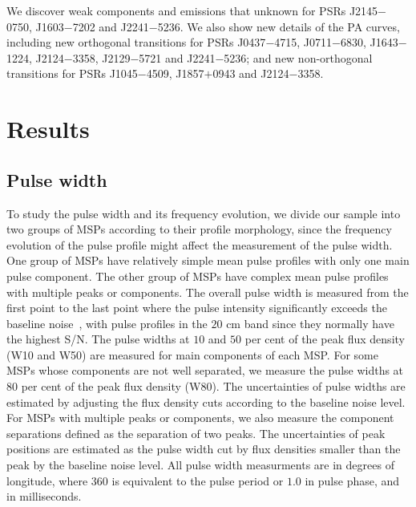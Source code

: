 \documentclass[useAMS,usenatbib]{mn2e}
\begin{document}
We discover weak components and emissions that unknown for PSRs J2145$-$0750, 
J1603$-$7202 and J2241$-$5236.
%
We also show new details of the PA curves, including new orthogonal 
transitions for PSRs J0437$-$4715, J0711$-$6830, J1643$-$1224, J2124$-$3358, 
J2129$-$5721 and J2241$-$5236; and new non-orthogonal transitions for 
PSRs J1045$-$4509, J1857$+$0943 and J2124$-$3358.
%

\section{Results}
\subsection{Pulse width}

To study the pulse width and its frequency evolution, we divide our sample 
into two groups of MSPs according to their profile morphology, since the 
frequency evolution of the pulse profile might affect the measurement of 
the pulse width.
%
One group of MSPs have relatively simple mean pulse profiles with only one 
main pulse component. 
%
The other group of MSPs have complex mean pulse profiles with multiple 
peaks or components.
%
The overall pulse width is measured from the first point to the last point 
where the pulse intensity significantly exceeds the baseline 
noise~\citep{Yan11}, with pulse profiles in the $20$ cm band since they 
normally have the highest S/N.
%
The pulse widths at $10$ and $50$ per cent of the peak flux density (W10 
and W50) are measured for main components of each MSP. For some MSPs whose 
components are not well separated, we measure the pulse widths at $80$ 
per cent of the peak flux density (W80). The uncertainties of pulse widths 
are estimated by adjusting the flux density cuts according to the baseline 
noise level.
%
For MSPs with multiple peaks or components, we also measure the component 
separations defined as the separation of two peaks. The uncertainties 
of peak positions are estimated as the pulse width cut by flux densities 
smaller than the peak by the baseline noise level. 
%
All pulse width measurments are in degrees of longitude, where $360$ is 
equivalent to the pulse period or $1.0$ in pulse phase, and in milliseconds.
%
\end{document}
